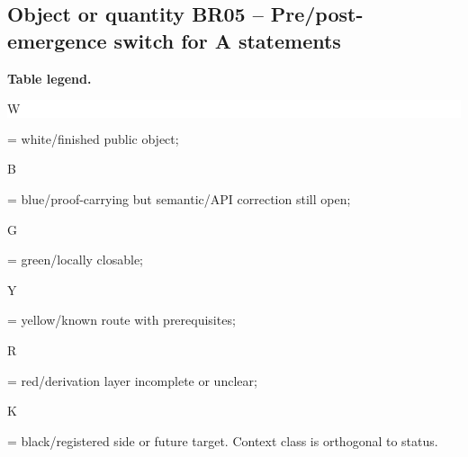 \subsection*{Object or quantity BR05 -- Pre/\allowbreak{}post-emergence switch for A statements}
\hypertarget{objproof:BR05}{}
\par\smallskip\noindent\begin{minipage}{0.99\linewidth}\footnotesize\raggedright\textbf{Table legend.} \colorbox{white}{\strut W} = white/finished public object; \colorbox{cyan!20}{\strut B} = blue/proof-carrying but semantic/API correction still open; \colorbox{green!18}{\strut G} = green/locally closable; \colorbox{yellow!25}{\strut Y} = yellow/known route with prerequisites; \colorbox{red!20}{\strut R} = red/derivation layer incomplete or unclear; \colorbox{black!18}{\strut K} = black/registered side or future target. Context class is orthogonal to status.\end{minipage}\par\vspace{0.25em}
